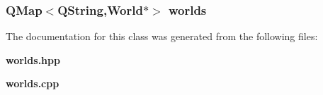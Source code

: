 \subsubsection{\setlength{\rightskip}{0pt plus 5cm}QMap$<$QString,{\bf World}$\ast$$>$ {\bf worlds}\hspace{0.3cm}{\tt  [protected]}}\label{classWorlds_p0}




The documentation for this class was generated from the following files:\begin{CompactItemize}
\item 
{\bf worlds.hpp}\item 
{\bf worlds.cpp}\end{CompactItemize}
